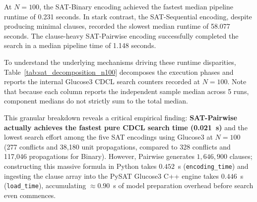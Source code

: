 At $N=100$, the SAT-Binary encoding achieved the fastest median pipeline runtime of 0.231 seconds. In stark contrast, the SAT-Sequential encoding, despite producing minimal clauses, recorded the slowest median runtime of 58.077 seconds. The clause-heavy SAT-Pairwise encoding successfully completed the search in a median pipeline time of 1.148 seconds.

To understand the underlying mechanisms driving these runtime disparities, Table~\ref{tab:sat_decomposition_n100} decomposes the execution phases and reports the internal Glucose3 CDCL search counters recorded at $N=100$. Note that because each column reports the independent sample median across 5 runs, component medians do not strictly sum to the total median.

\begin{table}[htbp]
\centering
\caption{Fine-grained execution phase decomposition and Glucose3 CDCL metrics at $N=100$ (medians across 5 runs).}
\label{tab:sat_decomposition_n100}
\end{table}

This granular breakdown reveals a critical empirical finding: \textbf{SAT-Pairwise actually achieves the fastest pure CDCL search time (0.021~s)} and the lowest search effort among the five SAT encodings using Glucose3 at $N=100$ (277 conflicts and 38,180 unit propagations, compared to 328 conflicts and 117,046 propagations for Binary). However, Pairwise generates $1,646,900$ clauses; constructing this massive formula in Python takes $0.452$~s (\texttt{encoding\_time}) and ingesting the clause array into the PySAT Glucose3 C++ engine takes $0.446$~s (\texttt{load\_time}), accumulating $\approx 0.90$~s of model preparation overhead before search even commences. 

